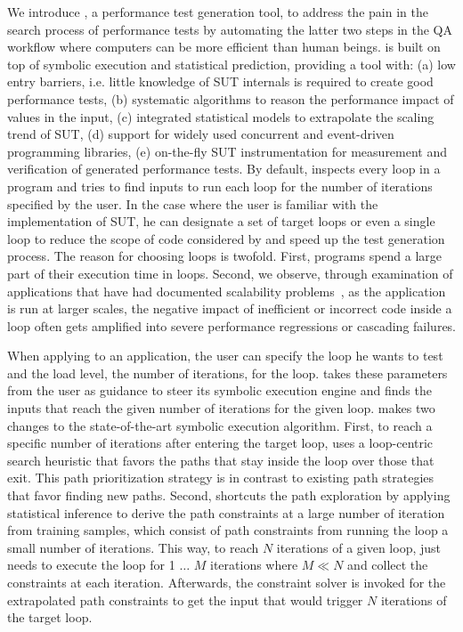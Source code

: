 We introduce \lancet, a performance test generation tool, to address the pain in the search process of performance tests by automating the latter two steps in the QA workflow where computers can be more efficient than human beings.
\lancet is built on top of symbolic execution and statistical prediction, providing a tool with:
(a) low entry barriers, i.e. little knowledge of SUT internals is required to create good performance tests,
(b) systematic algorithms to reason the performance impact of values in the input,
(c) integrated statistical models to extrapolate the scaling trend of SUT,
(d) support for widely used concurrent and event-driven programming libraries,
(e) on-the-fly SUT instrumentation for measurement and verification of generated performance tests.
By default, \lancet inspects every loop in a program and tries to find inputs to run each loop for the number of iterations specified by the user.
In the case where the user is familiar with the implementation of SUT, he can designate a set of target loops or even a single loop to reduce the scope of code considered by \lancet and speed up the test generation process.
The reason for choosing loops is twofold. %
First, programs spend a large part of their execution time in loops.
Second, we observe, through examination of applications that have had documented scalability problems~\cite{XXX}, as the application is run at larger scales, the negative impact of inefficient or incorrect code inside a loop often gets amplified into severe performance regressions or cascading failures.

When applying \lancet to an application, the user can specify the loop he wants to test and the load level, \ie the number of iterations, for the loop.
\lancet takes these parameters from the user as guidance to steer its symbolic execution engine and finds the inputs that reach the given number of iterations for the given loop.
\lancet makes two changes to the state-of-the-art symbolic execution algorithm.
First, to reach a specific number of iterations after entering the target loop, \lancet uses a loop-centric search heuristic that favors the paths that stay inside the loop over those that exit.
This path prioritization strategy is in contrast to existing path strategies that favor finding new paths.
Second, \lancet shortcuts the path exploration by applying statistical inference to derive the path constraints at a large number of iteration from training samples, which consist of path constraints from running the loop a small number of iterations.
This way, to reach $N$ iterations of a given loop, \lancet just needs to execute the loop for 1 $\ldots$ $M$ iterations where $M \ll N$ and collect the constraints at each iteration. Afterwards, the constraint solver is invoked for the extrapolated path constraints to get the input that would trigger $N$ iterations of the target loop.

